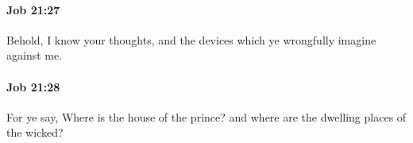 		\paragraph{Job 21:27} %
			\label{JOB-21-27}

			Behold, I know your thoughts, and the devices which ye wrongfully imagine against me.


		\paragraph{Job 21:28} %
			\label{JOB-21-28}

			For ye say, Where is the house of the prince? and where are the dwelling places of the wicked?



